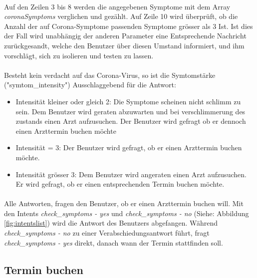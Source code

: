 \documentclass[11pt,a4paper]{article}
\begin{document}
        \paragraph{}
            Auf den Zeilen 3 bis 8 werden die angegebenen Symptome mit dem Array \emph{coronaSymptoms} verglichen und gezählt.
            Auf Zeile 10 wird überprüft, ob die Anzahl der auf Corona-Symptome passenden Symptome grösser als 3 Ist. Ist dies
            der Fall wird unabhängig der anderen Parameter eine Entsprechende Nachricht zurückgesandt, welche den Benutzer über
            diesen Umstand informiert, und ihm vorschlägt, sich zu isolieren und testen zu lassen.

        \paragraph{}
            Besteht kein verdacht auf das Corona-Virus, so ist die Symtomstärke ("symtom\_intensity") Ausschlaggebend für die Antwort:
            \begin{itemize}
                \item Intensität kleiner oder gleich 2: Die Symptome scheinen nicht schlimm zu sein. Dem Benutzer wird geraten abzuwarten und bei
                    verschlimmerung des zustands einen Arzt aufzusuchen. Der Benutzer wird gefragt ob er dennoch einen Arzttermin buchen
                    möchte
                \item Intensität = 3: Der Benutzer wird gefragt, ob er einen Arzttermin buchen möchte.
                \item Intensität grösser 3: Dem Benutzer wird angeraten einen Arzt aufzusuchen. Er wird gefragt, ob er einen entsprechenden Termin
                    buchen möchte.
            \end{itemize}

        \paragraph{}
            Alle Antworten, fragen den Benutzer, ob er einen Arzttermin buchen will. Mit den Intents \emph{check\_symptoms - yes} und \emph{check\_symptoms - no}
            (Siehe: Abbildung \ref{fig:intentslist}) wird die Antwort des Benutzers abgefangen. Während \emph{check\_symptoms - no} zu einer Verabschiedungsantwort führt,
            fragt \emph{check\_symptoms - yes} direkt, danach wann der Termin stattfinden soll.

    \subsection{Termin buchen}
\end{document}
